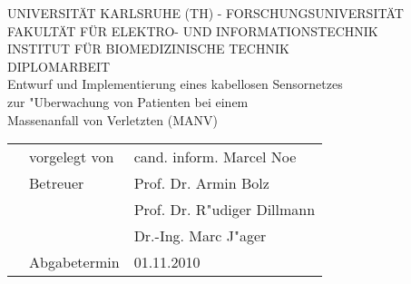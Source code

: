 \begin{center}
{}
\end{center}
\begin{center}
\textsf{\large UNIVERSITÄT KARLSRUHE (TH) - FORSCHUNGSUNIVERSITÄT}\\
			\vspace{0.3cm}
\textsf{\large FAKULTÄT FÜR ELEKTRO- UND INFORMATIONSTECHNIK}\\
			\vspace{0.3cm}
\textsf{\large INSTITUT FÜR BIOMEDIZINISCHE TECHNIK}\\
			\vspace{1.5cm}
\textsf{{\Huge DIPLOMARBEIT\\}}
			\vspace{2cm}
\textsf{\Large Entwurf und Implementierung eines kabellosen Sensornetzes\vspace{0.25cm}\\
        \Large zur "Uberwachung von Patienten bei einem\vspace{0.5cm}\\
        \Large Massenanfall von Verletzten (MANV)}\\
			\vspace{3.0cm}
\begin{table}[ht]
	\begin{tabular}{p{0cm} p{5.1cm} l}
		& \textsf{\large vorgelegt von} 								& \textsf{\large cand. inform. Marcel Noe}\vspace{0.5cm}\\

		& \textsf{\large Betreuer}  & \textsf{\large Prof. Dr. Armin Bolz}\vspace{0.5cm}\\

		& \textsf{\large }			& \textsf{\large Prof. Dr. R"udiger Dillmann}\vspace{0.5cm}\\
		
		& \textsf{\large }			& \textsf{\large Dr.-Ing. Marc J"ager}\vspace{0.5cm}\\
		
		& \textsf{\large Abgabetermin}				& \textsf{\large 01.11.2010}\\
	\end{tabular}	
\end{table}
\end{center}
\thispagestyle{empty}
\clearpage
